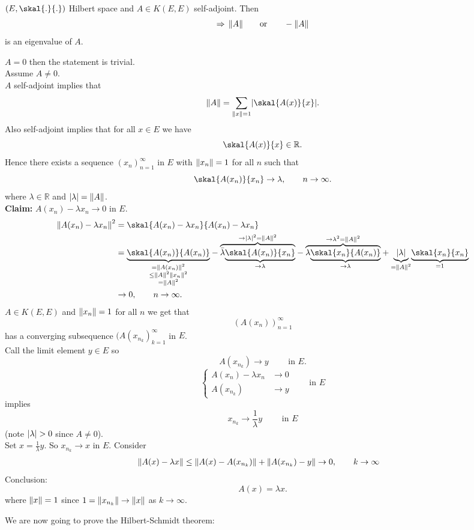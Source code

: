 \begin{proposition}
	$(E, \skal{.}{.})$ Hilbert space and $A \in K(E,E)$ self-adjoint. Then
	\[
		\Rightarrow \,\norm{A} \qquad \text{or} \qquad  - \norm{A}
	\]
	is an eigenvalue of $A$.
\end{proposition}
\begin{beweis}
	$A = 0$ then the statement is trivial. \\
	Assume $A \neq 0$. \\
	$A$ self-adjoint implies that 
	\[
		\norm{A} = \sum_{\norm{x}=1} \abs{\skal{A(x)}{x}}.
	\]
	Also self-adjoint implies that for all $x \in E$ we have
	\[
		\skal{A(x)}{x} \in \mathbb{R}.
	\]
	Hence there exists a sequence $(x_n)_{n=1}^{\infty}$ in $E$ with $\norm{x_n}=1$ for all $n$ such that
	\[
		\skal{A(x_n)}{x_n} \to \lambda, \qquad n \to \infty.
	\]
	where $\lambda \in \mathbb{R}$ and $\abs{\lambda} = \norm{A}$. \\
	\textbf{Claim:} \text{    }$A(x_n) - \lambda x_n \to 0$ in $E$. \\
	\begin{align*}
		\norm{A(x_n)- \lambda x_n}^2 &= \skal{A(x_n)-\lambda x_n}{A(x_n)- \lambda x_n} \\
		&= \underset{\substack{= \norm{A(x_n)}^2 \\ \leq \norm{A}^2 \norm{x_n}^2 \\ = \norm{A}^2}}{\underbrace{\skal{A(x_n)}{A(x_n)}}}- 
		\overset{\to \abs{\lambda}^2 = \norm{A}^2}{\overbrace{\bar{\lambda} 
		\underset{ \to  \lambda}{\underbrace{\skal{A(x_n)}{x_n}}}}}- \overset{\to \lambda^2 = \norm{A}^2}{\overbrace{\lambda \underset{\to \lambda}{\underbrace{\skal{x_n}{A(x_n)}}}}} + \underset{= \norm{A}^2}{\underbrace{\abs{\lambda}}} \underset{=1}{\underbrace{\skal{x_n}{x_n}}} \\
		&\to 0, \qquad n \to \infty.
	\end{align*}
	$A \in K(E,E)$ and $\norm{x_n}=1$ for all $n$ we get that 
	\[
		(A(x_n))_{n=1}^{\infty} 
	\]
	has a converging subsequence $(A(x_{n_k})_{k=1}^{\infty}$ in $E$. \\
	Call the limit element $y \in E$ so
	\[
		A(x _{n_k}) \to y \qquad \text{ in }E. 
	\]
	\[
		\begin{cases}
			A(x_n) - \lambda x_n &\to 0\\
			A(x _{n_k}) &\to y
		\end{cases} \qquad \text{in }E
	\]
	implies
	\[
		x _{n_k} \to  \frac{1}{\lambda}y \qquad \text{ in }E
	\]
	(note $\lvert\lambda\rvert>0$ since $A \neq 0$). \\
	Set $x = \frac{1}{\lambda}y$. So $x _{n_k} \to x$ in $E$. Consider
	\begin{align*}
		\norm{A(x)- \lambda x} &\leq  \norm{A(x)-A(x _{n_k})} + \norm{A(x _{n_k})- y} \to 0, \qquad k \to \infty
	\end{align*}
	Conclusion: \[
		A(x) = \lambda x.
	\]
	where $\norm{x}=1$ since $1 = \norm{x _{n_k}} \to  \norm{x}$ as $k \to \infty$.
\end{beweis}
We are now going to prove the Hilbert-Schmidt theorem:

